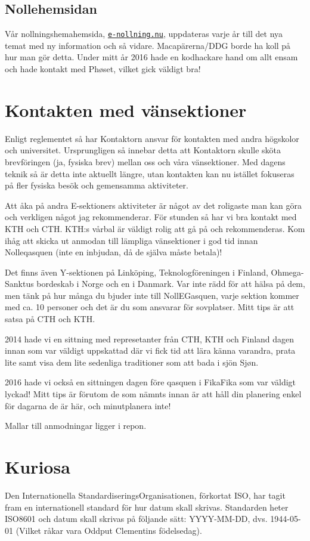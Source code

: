\documentclass[10pt]{article}
\begin{document}
\subsection{Nollehemsidan}
Vår nollningshemahemsida, \href{https://e-nollning.nu}{\texttt{e-nollning.nu}}, uppdateras varje år till det nya temat med ny information och så vidare. Macapärerna/DDG borde ha koll på hur man gör detta. Under mitt år 2016 hade en kodhackare hand om allt ensam och hade kontakt med Ph\o set, vilket gick väldigt bra!

\section{Kontakten med vänsektioner}
Enligt reglementet så har Kontaktorn ansvar för kontakten med andra högskolor och universitet. Ursprungligen så innebar detta att Kontaktorn skulle sköta brevföringen (ja, fysiska brev) mellan oss och våra vänsektioner. Med dagens teknik så är detta inte aktuellt längre, utan kontakten kan nu istället fokuseras på fler fysiska besök och gemensamma aktiviteter.

Att åka på andra E-sektioners aktiviteter är något av det roligaste man kan göra och verkligen något jag rekommenderar. För stunden så har vi bra kontakt med KTH och CTH. KTH:s vårbal är väldigt rolig att gå på och rekommenderas. Kom ihåg att skicka ut anmodan till lämpliga vänsektioner i god tid innan Nolleqasquen (inte en inbjudan, då de själva måste betala)!

Det finns även Y-sektionen på Linköping, Teknologföreningen i Finland, Ohmega-Sanktus bordeskab i Norge och en i Danmark. Var inte rädd för att hälsa på dem, men tänk på hur många du bjuder inte till NollEGasquen, varje sektion kommer med ca. 10 personer och det är du som ansvarar för sovplatser. Mitt tips är att satsa på CTH och KTH.

2014 hade vi en sittning med represetanter från CTH, KTH och Finland dagen innan som var väldigt uppskattad där vi fick tid att lära känna varandra, prata lite samt visa dem lite sedenliga traditioner som att bada i sjön Sj\o n.

2016 hade vi också en sittningen dagen före qasquen i FikaFika som var väldigt lyckad! Mitt tips är förutom de som nämnts innan är att håll din planering enkel för dagarna de är här, och minutplanera inte!

Mallar till anmodningar ligger i repon.

\section{Kuriosa}
Den Internationella StandardiseringsOrganisationen, förkortat ISO, har tagit fram en internationell standard för hur datum skall skrivas. Standarden heter ISO8601 och datum skall skrivas på följande sätt: YYYY-MM-DD, dvs. 1944-05-01 (Vilket råkar vara Oddput Clementins födelsedag).
\end{document}
